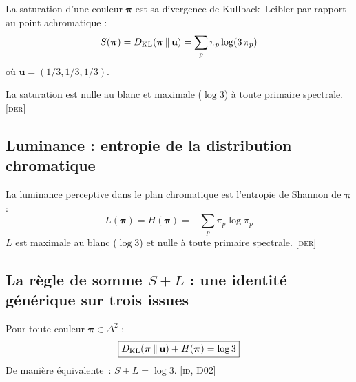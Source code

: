 \documentclass[12pt,a4paper]{article}
\begin{document}
\begin{derivedbox}
La saturation d'une couleur $\bm{\pi}$ est sa divergence de
Kullback--Leibler par rapport au point achromatique :
\begin{equation}
  S(\bm{\pi}) = D_{\mathrm{KL}}(\bm{\pi} \,\|\, \mathbf{u})
    = \sum_{p} \pi_p \log(3\,\pi_p)
  \label{eq:saturation}
\end{equation}
o\`u $\mathbf{u} = (1/3, 1/3, 1/3)$.

La saturation est nulle au blanc et maximale ($\log 3$) \`a toute
primaire spectrale. \textsc{[der]}
\end{derivedbox}

\subsection{Luminance : entropie de la distribution chromatique}

\begin{derivedbox}
La luminance perceptive dans le plan chromatique est l'entropie de
Shannon de $\bm{\pi}$ :
\begin{equation}
  L(\bm{\pi}) = H(\bm{\pi}) = -\sum_{p} \pi_p \log \pi_p
  \label{eq:luminance}
\end{equation}
$L$ est maximale au blanc ($\log 3$) et nulle \`a toute primaire
spectrale. \textsc{[der]}
\end{derivedbox}

\subsection{La r\`egle de somme $S + L$ : une identit\'e g\'en\'erique sur trois issues}

\begin{identitybox}
Pour toute couleur $\bm{\pi} \in \Delta^2$ :
\begin{equation}
  \boxed{D_{\mathrm{KL}}(\bm{\pi} \,\|\, \mathbf{u}) + H(\bm{\pi}) = \log 3}
  \label{eq:gft}
\end{equation}
De mani\`ere \'equivalente~: $S + L = \log 3$.
\textsc{[id, D02]}
\end{identitybox}
\end{document}
